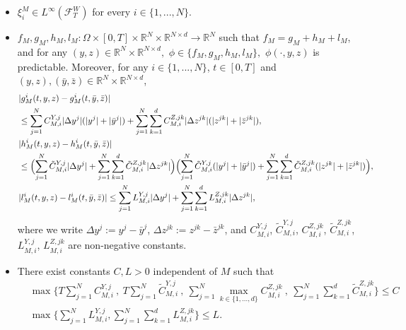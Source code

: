 \documentclass[10pt,a4paper]{amsart}
\newcommand{\MF}{{\mathcal{F}}}
\newcommand{\R}{\mathbb{R}}
\begin{document}
\begin{Assumption}\label{assu:well-posedBSDE}

\begin{itemize} 
     


\item[\textnormal{(i)}] $\xi_{i}^{M} \in L^{\infty}(\MF^W_T)$ for every $i \in \{1,...,N\}$.



\item[\textnormal{(ii)}] $f_{M},g_{M},h_{M},l_{M}: \Omega \times [0,T] \times \mathbb{R}^{N} \times \mathbb{R}^{N \times d} \rightarrow \mathbb{R}^{N}$ such that  $f_{M} = g_{M} + h_{M} + l_{M}$, and for any $(y,z) \in \R^N \times \R^{N \times d},$ $\phi \in \{ f_{M},g_{M},h_{M},l_{M}\},$ $\phi(\cdot, y,z)$ is predictable. Moreover, for any $i \in \{1,...,N\}$, $t \in [0,T]$ and $(y,z),(\bar{y},\bar{z}) \in \mathbb{R}^{N} \times \mathbb{R}^{N \times d}$, 
\begin{align}\label{equ:3.estcomponent}
&|g_{M}^{i}(t,y,z) - g_{M}^{i}(t,\bar{y},\bar{z})|  \\
&\leq \sum_{j=1}^{N}C_{M,i}^{Y,j}|\Delta y^{j}|(|y^{j}|+|\bar{y}^{j}|) + \sum_{j=1}^{N}\sum_{k=1}^{d}C_{M,i}^{Z,jk}|\Delta z^{jk}|(|z^{jk}|+|\bar{z}^{jk}|), \nonumber \\ \label{equ:3.estcross} 
&|h_{M}^{i}(t,y,z) - h_{M}^{i}(t,\bar{y},\bar{z})|  \\ 
& \leq \Bigl(\sum_{j=1}^{N}\tilde{C}_{M,i}^{Y,j}|\Delta y^{j}| + \sum_{j=1}^{N}\sum_{k=1}^{d}\tilde{C}_{M,i}^{Z,jk}|\Delta z^{jk}|\Bigr)\Bigl(\sum_{j=1}^{N}\tilde{C}_{M,i}^{Y,j}(|y^{j}|+|\bar{y}^{j}|) + \sum_{j=1}^{N}\sum_{k=1}^{d}\tilde{C}_{M,i}^{Z,jk}(|z^{jk}|+|\bar{z}^{jk}|)\Bigr), \nonumber \\ \label{equ:3.estlinear}
&|l_{M}^{i}(t,y,z)-l_{M}^{i}(t,\bar{y},\bar{z})| \leq \sum_{j=1}^{N}L_{M,i}^{Y,j}|\Delta y^{j}| + \sum_{j=1}^{N}\sum_{k=1}^{d}L_{M,i}^{Z,jk}|\Delta z^{jk}|, 
\end{align}
where we write $\Delta y^{j} := y^{j}-\bar{y}^{j}$, $\Delta z^{jk} := z^{jk}-\bar{z}^{jk}$, and $C_{M,i}^{Y,j}$, $\tilde{C}_{M,i}^{Y,j}$, $C_{M,i}^{Z,jk}$, $\tilde{C}_{M,i}^{Z,jk}$, $L_{M,i}^{Y,j}$, $L_{M,i}^{Z,jk}$ are non-negative constants.


\item[\textnormal{(iii)}] There exist constants $C,L>0$ independent of $M$ such that 
\begin{align*}
&\max \Biggl\{T\sum_{j=1}^{N}C_{M,i}^{Y,j} \ , \ T\sum_{j=1}^{N}\tilde{C}_{M,i}^{Y,j} \ , \ \sum_{j=1}^{N}\max_{k \in \{1,...,d\}}C_{M,i}^{Z,jk} \ , \ \sum_{j=1}^{N}\sum_{k=1}^{d}\tilde{C}_{M,i}^{Z,jk}\Biggr\} \leq C\\
& \max\biggl\{\sum_{j=1}^{N}L_{M,i}^{Y,j},\sum_{j=1}^{N}\sum_{k=1}^{d}L_{M,i}^{Z,jk}\biggr\} \leq L.
\end{align*}


\end{itemize}
\end{Assumption}
\end{document}
